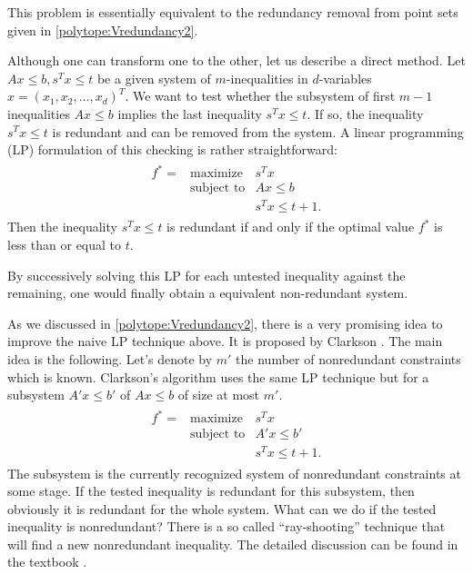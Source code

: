 \documentclass[[a4paper,12pt]{article}
\begin{document}
This problem is essentially equivalent to the redundancy
removal from point sets given in \ref{polytope:Vredundancy2}.

Although one can transform one to the other, let us describe
a direct method.  Let $A x \le b, s^T x \le t$ be a given system of $m$-inequalities in $d$-variables $x=(x_1,x_2,\ldots,x_d)^T$.
We want to test whether the subsystem of first $m-1$ inequalities $A x \le b$ 
implies the last inequality $s^T x \le t$.  If so,
the inequality $s^T x \le t$ is redundant 
and can be removed from the system.
  A linear programming (LP)
formulation of this checking is rather straightforward:
\begin{align} \label{eq:Hredundancy_lp1}
\begin{array}{lll}
f^* = &\text{maximize}    & s^T x\\
&\text{subject to}  & A x \le b
\\  
&                   & s^T x  \le  t+1.
\end{array}
\end{align}
Then the inequality $s^T x \le t$ is redundant if and only if
the optimal value $f^*$ is less than or equal to $t$.

By successively solving this LP for each untested inequality 
against the remaining,
one would finally obtain a equivalent non-redundant system. 

As we discussed in \ref{polytope:Vredundancy2}, there is
a very promising idea to improve the naive LP technique above.
It is proposed by Clarkson  \cite{c-mosga-94} .
The main idea is the following.  Let's denote by $m'$ the number of 
nonredundant constraints which is known.  Clarkson's algorithm uses
the same LP technique but for a subsystem $A' x \le b'$ of $A x \le b$
of size at most $m'$.
\begin{align} \label{eq:Hredundancy_Clarkson}
\begin{array}{lll}
f^* = &\text{maximize}    & s^T x\\
&\text{subject to}  & A' x \le b'
\\  
&                   & s^T x  \le  t+1.
\end{array}
\end{align}
The subsystem is the currently recognized system of  nonredundant
constraints at some stage.  If the tested inequality is redundant for
this subsystem, then obviously it is redundant for the whole system.
What can we do if the tested inequality is nonredundant?   There is
a so called ``ray-shooting'' technique that will find a new nonredundant
inequality.  The detailed discussion can be found in the textbook \cite[Chap 7]{f-pc-20}.
\end{document}
